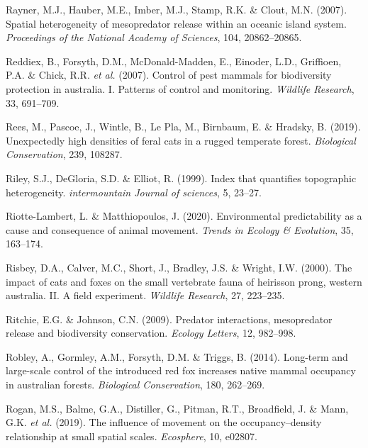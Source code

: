 \documentclass[]{elsarticle} %
\begin{document}
\leavevmode\hypertarget{ref-rayner2007}{}%
Rayner, M.J., Hauber, M.E., Imber, M.J., Stamp, R.K. \& Clout, M.N. (2007). Spatial heterogeneity of mesopredator release within an oceanic island system. \emph{Proceedings of the National Academy of Sciences}, 104, 20862--20865.

\leavevmode\hypertarget{ref-reddiex2007}{}%
Reddiex, B., Forsyth, D.M., McDonald-Madden, E., Einoder, L.D., Griffioen, P.A. \& Chick, R.R. \emph{et al.} (2007). Control of pest mammals for biodiversity protection in australia. I. Patterns of control and monitoring. \emph{Wildlife Research}, 33, 691--709.

\leavevmode\hypertarget{ref-rees2019}{}%
Rees, M., Pascoe, J., Wintle, B., Le Pla, M., Birnbaum, E. \& Hradsky, B. (2019). Unexpectedly high densities of feral cats in a rugged temperate forest. \emph{Biological Conservation}, 239, 108287.

\leavevmode\hypertarget{ref-riley1999}{}%
Riley, S.J., DeGloria, S.D. \& Elliot, R. (1999). Index that quantifies topographic heterogeneity. \emph{intermountain Journal of sciences}, 5, 23--27.

\leavevmode\hypertarget{ref-RIOTTELAMBERT2020163}{}%
Riotte-Lambert, L. \& Matthiopoulos, J. (2020). Environmental predictability as a cause and consequence of animal movement. \emph{Trends in Ecology \& Evolution}, 35, 163--174.

\leavevmode\hypertarget{ref-risbey2000}{}%
Risbey, D.A., Calver, M.C., Short, J., Bradley, J.S. \& Wright, I.W. (2000). The impact of cats and foxes on the small vertebrate fauna of heirisson prong, western australia. II. A field experiment. \emph{Wildlife Research}, 27, 223--235.

\leavevmode\hypertarget{ref-ritchie2009predator}{}%
Ritchie, E.G. \& Johnson, C.N. (2009). Predator interactions, mesopredator release and biodiversity conservation. \emph{Ecology Letters}, 12, 982--998.

\leavevmode\hypertarget{ref-robley2014}{}%
Robley, A., Gormley, A.M., Forsyth, D.M. \& Triggs, B. (2014). Long-term and large-scale control of the introduced red fox increases native mammal occupancy in australian forests. \emph{Biological Conservation}, 180, 262--269.

\leavevmode\hypertarget{ref-rogan2019}{}%
Rogan, M.S., Balme, G.A., Distiller, G., Pitman, R.T., Broadfield, J. \& Mann, G.K. \emph{et al.} (2019). The influence of movement on the occupancy--density relationship at small spatial scales. \emph{Ecosphere}, 10, e02807.
\end{document}
